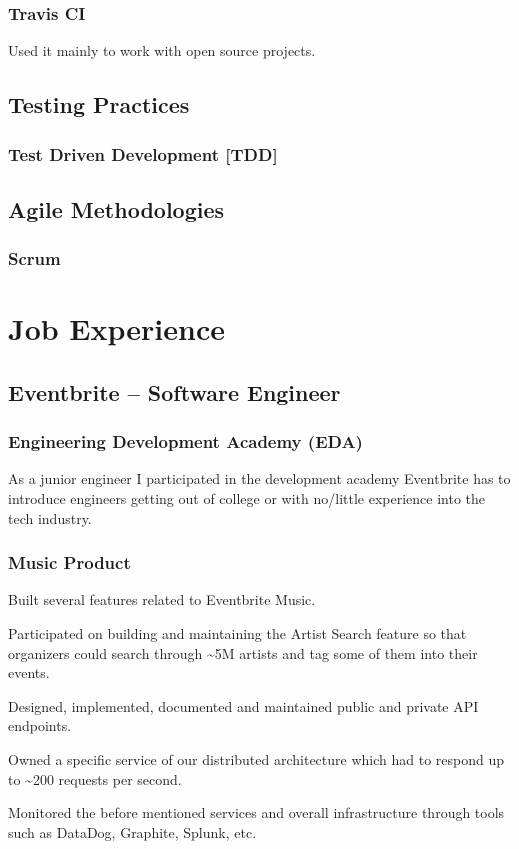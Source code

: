 \documentclass{article}
\begin{document}
\subsubsection{Travis CI}
  \begin{description}
    \item Used it mainly to work with open source projects.
  \end{description}
\subsection{Testing Practices}
\subsubsection{Test Driven Development [TDD]}
\subsection{Agile Methodologies}
\subsubsection{Scrum}
\section{Job Experience}
\subsection{Eventbrite – Software Engineer}
\subsubsection{Engineering Development Academy (EDA)}
  \begin{description}
    \item As a junior engineer I participated in the development academy Eventbrite has to introduce engineers getting out of college or with no/little experience into the tech industry.
  \end{description}
\subsubsection{Music Product}
  \begin{description}
    \item Built several features related to Eventbrite Music.
    \item Participated on building and maintaining the Artist Search feature so that organizers could search through \textasciitilde5M artists and tag some of them into their events.
    \item Designed, implemented, documented and maintained public and private API endpoints.
    \item Owned a specific service of our distributed architecture which had to respond up to \textasciitilde200 requests per second.
    \item Monitored the before mentioned services and overall infrastructure through tools such as DataDog, Graphite, Splunk, etc.
  \end{description}
\end{document}
